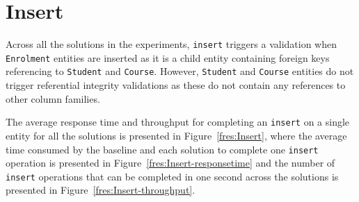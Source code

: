 \section{Insert} \label{s:results-insert}
Across all the solutions in the experiments,   \texttt{insert}  triggers a
validation when \texttt{Enrolment} entities are inserted as it is a child entity
containing foreign keys referencing to \texttt{Student} and \texttt{Course}. 
However,  \texttt{Student} and \texttt{Course} entities do not trigger
referential integrity validations as these do not contain any references to
other column families.

The average response time and throughput for completing an \texttt{insert} on a
single entity for all the solutions is presented in Figure~\ref{fres:Insert},  
where  the average time consumed by the baseline and each solution to complete one \texttt{insert} operation is presented in 
Figure~\ref{fres:Insert-responsetime} and 
 the number of \texttt{insert}
operations that can be completed in one second across the solutions is
presented in  Figure~\ref{fres:Insert-throughput}. 

